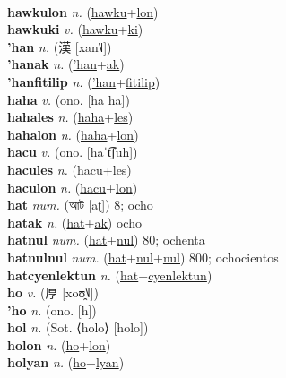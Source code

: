  \label{hawku} \\
\textbf{hawkulon} \textit{n.} (\hyperref[hawku]{hawku}+\hyperref[lon]{lon})
 \label{hawkulon} \\
\textbf{hawkuki} \textit{v.} (\hyperref[hawku]{hawku}+\hyperref[ki]{ki})
 \label{hawkuki} \\
\textbf{'han} \textit{n.} ({\chinese{}漢} [xan˥˩])
 \label{'han} \\
\textbf{'hanak} \textit{n.} (\hyperref['han]{'han}+\hyperref[ak]{ak})
 \label{'hanak} \\
\textbf{'hanfitilip} \textit{n.} (\hyperref['han]{'han}+\hyperref[fitilip]{fitilip})
 \label{'hanfitilip} \\
\textbf{haha} \textit{v.} (ono. [ha ha])
 \label{haha} \\
\textbf{hahales} \textit{n.} (\hyperref[haha]{haha}+\hyperref[les]{les})
 \label{hahales} \\
\textbf{hahalon} \textit{n.} (\hyperref[haha]{haha}+\hyperref[lon]{lon})
 \label{hahalon} \\
\textbf{hacu} \textit{v.} (ono. [haˈt͡ʃuh])
 \label{hacu} \\
\textbf{hacules} \textit{n.} (\hyperref[hacu]{hacu}+\hyperref[les]{les})
 \label{hacules} \\
\textbf{haculon} \textit{n.} (\hyperref[hacu]{hacu}+\hyperref[lon]{lon})
 \label{haculon} \\
\textbf{hat} \textit{num.} ({\bengali{}আট} [aʈ])
8; ocho \label{hat} \\
\textbf{hatak} \textit{n.} (\hyperref[hat]{hat}+\hyperref[ak]{ak})
ocho \label{hatak} \\
\textbf{hatnul} \textit{num.} (\hyperref[hat]{hat}+\hyperref[nul]{nul})
80; ochenta \label{hatnul} \\
\textbf{hatnulnul} \textit{num.} (\hyperref[hat]{hat}+\hyperref[nul]{nul}+\hyperref[nul]{nul})
800; ochocientos \label{hatnulnul} \\
\textbf{hatcyenlektun} \textit{n.} (\hyperref[hat]{hat}+\hyperref[cyenlektun]{cyenlektun})
 \label{hatcyenlektun} \\
\textbf{ho} \textit{v.} ({\chinese{}厚} [xoʊ̯˥˩])
 \label{ho} \\
\textbf{'ho} \textit{n.} (ono. [h])
 \label{'ho} \\
\textbf{hol} \textit{n.} (Sot. ⟨holo⟩ [holo])
 \label{hol} \\
\textbf{holon} \textit{n.} (\hyperref[ho]{ho}+\hyperref[lon]{lon})
 \label{holon} \\
\textbf{holyan} \textit{n.} (\hyperref[ho]{ho}+\hyperref[lyan]{lyan})
